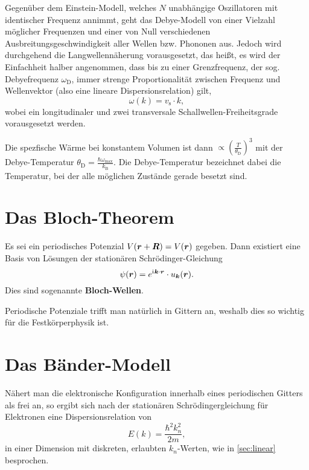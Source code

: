 Gegenüber dem Einstein-Modell, welches $N$ unabhängige Oszillatoren mit identischer Frequenz annimmt, geht das Debye-Modell von einer Vielzahl möglicher Frequenzen und einer von Null verschiedenen Ausbreitungsgeschwindigkeit aller Wellen bzw. Phononen aus.
Jedoch wird durchgehend die Langwellennäherung vorausgesetzt, das heißt, es wird der Einfachheit halber angenommen, dass bis zu einer Grenzfrequenz, der sog. Debyefrequenz $\omega_\text{D}$, immer strenge Proportionalität zwischen Frequenz und Wellenvektor (also eine lineare Dispersionsrelation) gilt,
\begin{equation*}
	\omega(k) = v_\text{s}\cdot k,
\end{equation*}
wobei ein longitudinaler und zwei transversale Schallwellen-Freiheitsgrade vorausgesetzt werden.

Die spezfische Wärme bei konstantem Volumen ist dann $\propto \left(\frac{T}{\theta_\text{D}}\right)^3$ mit der Debye-Temperatur $\theta_\text{D}=\frac{\hbar\omega_\text{max}}{k_\text{B}}$.
Die Debye-Temperatur bezeichnet dabei die Temperatur, bei der alle möglichen Zustände gerade besetzt sind.

\section{Das Bloch-Theorem}
Es sei ein periodisches Potenzial $V(\boldsymbol{r}+\boldsymbol{R}) = V(\boldsymbol{r})$ gegeben.
Dann existiert eine Basis von Lösungen der stationären Schrödinger-Gleichung
\begin{equation*}
	\psi(\boldsymbol{r}) = e^{\mathrm{i}\mkern1mu\boldsymbol{k}\cdot\boldsymbol{r}}\cdot u_{\boldsymbol{k}}(\boldsymbol{r}).
\end{equation*}
Dies sind sogenannte \textbf{Bloch-Wellen}.

Periodische Potenziale trifft man natürlich in Gittern an, weshalb dies so wichtig für die Festkörperphysik ist.

\section{Das Bänder-Modell}
Nähert man die elektronische Konfiguration innerhalb eines periodischen Gitters als frei an, so ergibt sich nach der stationären Schrödingergleichung für Elektronen eine Dispersionsrelation von
\begin{equation*}
	E(k) = \frac{\hbar^2 k_n^2}{2m},
\end{equation*}
in einer Dimension mit diskreten, erlaubten $k_n$-Werten, wie in \autoref{sec:linear} besprochen.

